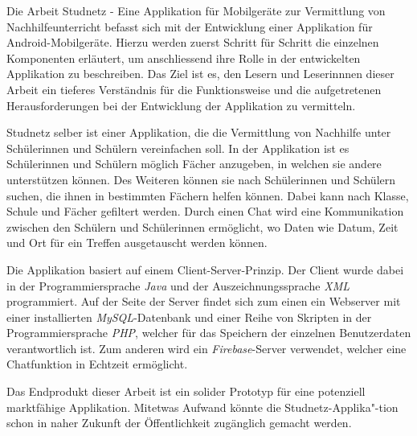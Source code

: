 \documentclass[../main.tex]{subfiles}
\begin{document}
	
	Die Arbeit \glqq Studnetz - Eine Applikation für Mobilgeräte zur Vermittlung von Nachhilfeunterricht\grqq{} befasst sich mit der Entwicklung einer Applikation für Android-Mobilgeräte. Hierzu werden zuerst Schritt für Schritt die einzelnen Komponenten erläutert, um anschliessend ihre Rolle in der entwickelten Applikation zu beschreiben. Das Ziel ist es, den Lesern und Leserinnnen dieser Arbeit ein tieferes Verständnis für die Funktionsweise und die aufgetretenen Herausforderungen bei der Entwicklung der Applikation zu vermitteln.
	
	Studnetz selber ist einer Applikation, die die Vermittlung von Nachhilfe unter Schülerinnen und Schülern vereinfachen soll. In der Applikation ist es Schülerinnen und Schülern möglich Fächer anzugeben, in welchen sie andere unterstützen können. Des Weiteren können sie nach Schülerinnen und Schülern suchen, die ihnen in bestimmten Fächern helfen können. Dabei kann nach Klasse, Schule und Fächer gefiltert werden. Durch einen Chat wird eine Kommunikation zwischen den Schülern und Schülerinnen ermöglicht, wo Daten wie Datum, Zeit und Ort für ein Treffen ausgetauscht werden können.
	
	Die Applikation basiert auf einem Client-Server-Prinzip. Der Client wurde dabei in der Programmiersprache \emph{Java} und der Auszeichnungssprache \emph{XML} programmiert. Auf der Seite der Server findet sich zum einen ein Webserver mit einer installierten \emph{MySQL}-Datenbank und einer Reihe von Skripten in der Programmiersprache \emph{PHP}, welcher für das Speichern der einzelnen Benutzerdaten verantwortlich ist. Zum anderen wird ein \emph{Firebase}-Server verwendet, welcher eine Chatfunktion in Echtzeit ermöglicht.
	
	Das Endprodukt dieser Arbeit ist ein solider Prototyp für eine potenziell marktfähige Applikation. Mitetwas Aufwand könnte die Studnetz-Applika"-tion schon in naher Zukunft der Öffentlichkeit zugänglich gemacht werden.
	
\end{document}
